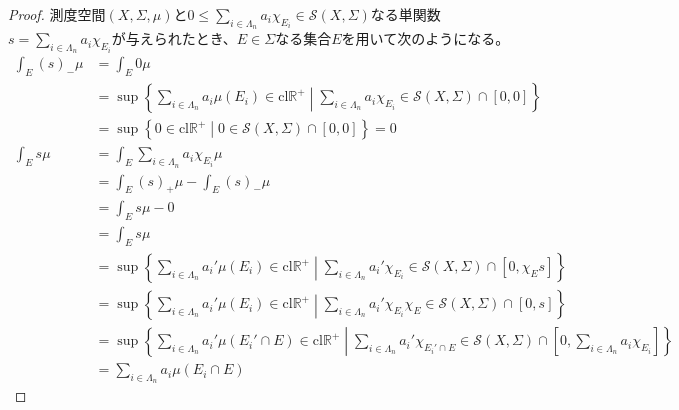 \documentclass[dvipdfmx]{jsarticle}
\begin{document}
\begin{proof}
測度空間$(X,\varSigma,\mu)$と$0 \leq \sum_{i \in \varLambda_{n}} {a_{i}\chi_{E_{i}}}\in \mathcal{S}(X,\varSigma)$なる単関数$s = \sum_{i \in \varLambda_{n}} {a_{i}\chi_{E_{i}}}$が与えられたとき、$E \in \varSigma$なる集合$E$を用いて次のようになる。
\begin{align*}
\int_{E} {(s)_{-}\mu} &= \int_{E} {0\mu}\\
&= \sup\left\{ \sum_{i \in \varLambda_{n}} {a_{i}\mu\left( E_{i} \right)} \in \mathrm{cl}\mathbb{R}^{+} \middle| \sum_{i \in \varLambda_{n}} {a_{i}\chi_{E_{i}}}\in \mathcal{S}(X,\varSigma) \cap [ 0,0] \right\}\\
&= \sup\left\{ 0 \in \mathrm{cl}\mathbb{R}^{+} \middle| 0 \in \mathcal{S}(X,\varSigma) \cap [ 0,0] \right\} = 0\\
\int_{E} {s\mu} &= \int_{E} {\sum_{i \in \varLambda_{n}} {a_{i}\chi_{E_{i}}}\mu}\\
&= \int_{E} {(s)_{+}\mu} - \int_{E} {(s)_{-}\mu}\\
&= \int_{E} {s\mu} - 0\\
&= \int_{E} {s\mu}\\
&= \sup\left\{ \sum_{i \in \varLambda_{n}} {a_{i}'\mu\left( E_{i} \right)} \in \mathrm{cl}\mathbb{R}^{+} \middle| \sum_{i \in \varLambda_{n}} {a_{i}'\chi_{E_{i}}}\in \mathcal{S}(X,\varSigma) \cap \left[ 0,\chi_{E}s \right] \right\}\\
&= \sup\left\{ \sum_{i \in \varLambda_{n}} {a_{i}'\mu\left( E_{i} \right)} \in \mathrm{cl}\mathbb{R}^{+} \middle| \sum_{i \in \varLambda_{n}} {a_{i}'\chi_{E_{i}}\chi_{E}}\in \mathcal{S}(X,\varSigma) \cap [ 0,s] \right\}\\
&= \sup\left\{ \sum_{i \in \varLambda_{n}} {a_{i}'\mu\left( E_{i}' \cap E \right)} \in \mathrm{cl}\mathbb{R}^{+} \middle| \sum_{i \in \varLambda_{n}} {a_{i}'\chi_{E_{i}' \cap E}}\in \mathcal{S}(X,\varSigma) \cap \left[ 0,\sum_{i \in \varLambda_{n}} {a_{i}\chi_{E_{i}}} \right] \right\}\\
&= \sum_{i \in \varLambda_{n}} {a_{i}\mu\left( E_{i} \cap E \right)}
\end{align*}
\end{proof}
\end{document}
